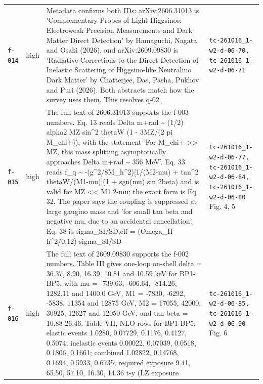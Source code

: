 \documentclass[11pt,a4paper]{article}
\begin{document}
\begin{longtable}{@{}p{}p{}p{}p{}@{}}
\texttt{f-014} & high & Metadata confirms both IDs: arXiv:2606.31013 is 'Complementary Probes of Light Higgsinos: Electroweak Precision Measurements and Dark Matter Direct Detection' by Hamaguchi, Nagata and Osaki (2026), and arXiv:2609.09830 is 'Radiative Corrections to the Direct Detection of Inelastic Scattering of Higgsino-like Neutralino Dark Matter' by Chatterjee, Das, Pasha, Pukhov and Puri (2026). Both abstracts match how the survey uses them. This resolves q-02. & \texttt{tc-261016\_\allowbreak{}1-w2-d-06-70,\allowbreak{} tc-261016\_\allowbreak{}1-w2-d-06-71} \\
\texttt{f-015} & high & The full text of 2606.31013 supports the f-003 numbers. Eq. 13 reads Delta m+\textbar{}rad \textasciitilde{} (1/2) alpha2 MZ sin\textasciicircum{}2 thetaW (1 - 3MZ/(2 pi M\_chi+)), with the statement 'For M\_chi+ \textgreater{}\textgreater{} MZ, this mass splitting asymptotically approaches Delta m+\textbar{}rad \textasciitilde{} 356 MeV'. Eq. 33 reads f\_q \textasciitilde{} -(g\textasciicircum{}2/8M\_h\textasciicircum{}2)[1/(M2-\textbar{}mu\textbar{}) + tan\textasciicircum{}2 thetaW/(M1-\textbar{}mu\textbar{})](1 + sgn(mu) sin 2beta) and is valid for MZ \textless{}\textless{} M1,2-\textbar{}mu\textbar{}; the exact form is Eq. 32. The paper says the coupling is suppressed at large gaugino mass and 'for small tan beta and negative mu, due to an accidental cancellation'. Eq. 38 is sigma\_SI/SD,eff = (Omega\_H h\textasciicircum{}2/0.12) sigma\_SI/SD & \texttt{tc-261016\_\allowbreak{}1-w2-d-06-77,\allowbreak{} tc-261016\_\allowbreak{}1-w2-d-06-84,\allowbreak{} tc-261016\_\allowbreak{}1-w2-d-06-80} Fig. 4, 5 \\
\texttt{f-016} & high & The full text of 2609.09830 supports the f-002 numbers. Table III gives one-loop on-shell delta = 36.37, 8.90, 16.39, 10.81 and 10.59 keV for BP1-BP5, with mu = -739.63, -606.64, -814.26, 1282.11 and 1400.0 GeV, M1 = -7830, -6292, -5838, 11354 and 12875 GeV, M2 = 17055, 42000, 30925, 12627 and 12050 GeV, and tan beta = 10.88-26.46. Table VII, NLO rows for BP1-BP5: elastic events 1.0280, 0.07729, 0.1176, 0.4127, 0.5074; inelastic events 0.00022, 0.07039, 0.0518, 0.1806, 0.1661; combined 1.02822, 0.14768, 0.1694, 0.5933, 0.6735; required exposure 9.41, 65.50, 57.10, 16.30, 14.36 t-y (LZ exposure & \texttt{tc-261016\_\allowbreak{}1-w2-d-06-85,\allowbreak{} tc-261016\_\allowbreak{}1-w2-d-06-90} Fig. 6 \\

\end{longtable}
\end{document}
